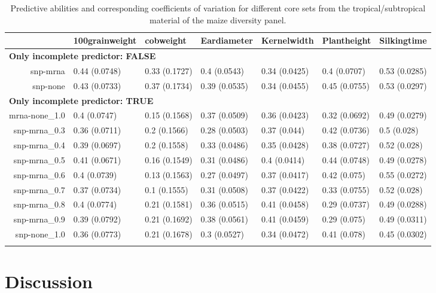 \documentclass[]{elsarticle} %
\begin{document}
\begin{table}[ht]
\centering
\caption{Predictive abilities and corresponding coefficients of variation for different core sets from the tropical/subtropical material of the maize diversity panel.} 
\begin{tabular}{rllllll}
  \toprule
 & 100grainweight & cobweight & Eardiameter & Kernelwidth & Plantheight & Silkingtime \\ 
  \midrule
\multicolumn{6}{l}{{\bfseries Only incomplete predictor: FALSE}}\\
snp-mrna & 0.44 (0.0748) & 0.33 (0.1727) & 0.4 (0.0543) & 0.34 (0.0425) & 0.4 (0.0707) & 0.53 (0.0285) \\ 
  snp-none & 0.43 (0.0733) & 0.37 (0.1734) & 0.39 (0.0535) & 0.34 (0.0455) & 0.45 (0.0755) & 0.53 (0.0297) \\ 
   \midrule
\multicolumn{6}{l}{{\bfseries Only incomplete predictor: TRUE}}\\
mrna-none\_1.0 & 0.4 (0.0747) & 0.15 (0.1568) & 0.37 (0.0509) & 0.36 (0.0423) & 0.32 (0.0692) & 0.49 (0.0279) \\ 
  snp-mrna\_0.3 & 0.36 (0.0711) & 0.2 (0.1566) & 0.28 (0.0503) & 0.37 (0.044) & 0.42 (0.0736) & 0.5 (0.028) \\ 
  snp-mrna\_0.4 & 0.39 (0.0697) & 0.2 (0.1558) & 0.33 (0.0486) & 0.35 (0.0428) & 0.38 (0.0727) & 0.52 (0.028) \\ 
  snp-mrna\_0.5 & 0.41 (0.0671) & 0.16 (0.1549) & 0.31 (0.0486) & 0.4 (0.0414) & 0.44 (0.0748) & 0.49 (0.0278) \\ 
  snp-mrna\_0.6 & 0.4 (0.0739) & 0.13 (0.1563) & 0.27 (0.0497) & 0.37 (0.0417) & 0.42 (0.075) & 0.55 (0.0272) \\ 
  snp-mrna\_0.7 & 0.37 (0.0734) & 0.1 (0.1555) & 0.31 (0.0508) & 0.37 (0.0422) & 0.33 (0.0755) & 0.52 (0.028) \\ 
  snp-mrna\_0.8 & 0.4 (0.0774) & 0.21 (0.1581) & 0.36 (0.0515) & 0.41 (0.0458) & 0.29 (0.0737) & 0.49 (0.0288) \\ 
  snp-mrna\_0.9 & 0.39 (0.0792) & 0.21 (0.1692) & 0.38 (0.0561) & 0.41 (0.0459) & 0.29 (0.075) & 0.49 (0.0311) \\ 
  snp-none\_1.0 & 0.36 (0.0773) & 0.21 (0.1678) & 0.3 (0.0527) & 0.34 (0.0472) & 0.41 (0.078) & 0.45 (0.0302) \\ 
   \bottomrule
\multicolumn{6}{l}{}\\
\end{tabular}
\end{table}

\section{Discussion}\label{discussion}
\end{document}
